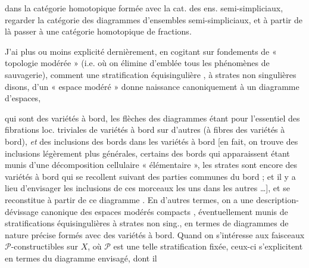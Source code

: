 \documentclass[11pt,a4paper]{article}
\begin{document}
dans la catégorie homotopique formée avec la cat. des ens. semi-simpliciaux,  regarder la catégorie des diagrammes d'ensembles semi-simpliciaux, et à partir de là passer à une catégorie homotopique de fractions.

J'ai plus ou moins explicité dernièrement, en cogitant sur  fondements de « topologie modérée » (i.e. où on élimine d'emblée tous les phénomènes de sauvagerie), comment une stratification équisingulière \struck{\ill{}}, à strates non singulières disons, d'un « espace modéré »  donne naissance canoniquement à un diagramme \struck{\ill{}} d'espaces,

qui sont des variétés à bord, les \struck{\ill{}} flèches des diagrammes étant pour l'essentiel des fibrations loc. triviales de variétés à bord sur d'autres (à fibres des variétés à bord), \emph{et} des inclusions des bords dans les variétés à bord [en fait, on trouve des inclusions légèrement plus générales, certains des bords qui apparaissent étant munis d'une décomposition cellulaire « élémentaire »,  \struck{\ill{}} les strates  sont encore des variétés à bord qui se recollent suivant des parties communes du bord ; et il y a lieu d'envisager  les inclusions de ces morceaux les uns dans les autres …], et se reconstitue à partir de ce diagramme . En d'autres termes, on a une description-dévissage canonique des espaces modérés compacts , éventuellement munis de stratifications équisingulières à strates non sing., en termes de diagrammes  de nature précise formés avec des variétés à bord. Quand on s'intéresse aux faisceaux  $\mathcal{P}$-constructibles sur $X$, où $\mathcal{P}$ est une telle stratification fixée, ceux-ci s'explicitent en termes du diagramme envisagé, dont il
\end{document}

